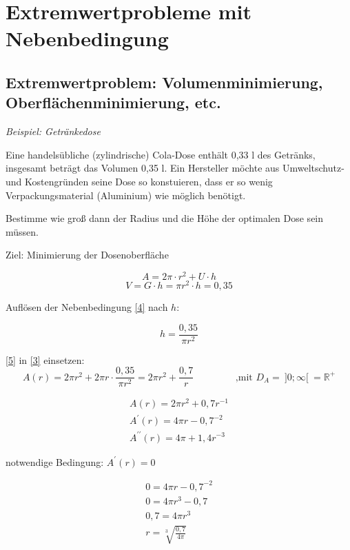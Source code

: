 \section{Extremwertprobleme mit Nebenbedingung}
\subsection{Extremwertproblem: Volumenminimierung, Oberflächenminimierung, etc.}

\textit{Beispiel: Getränkedose}

Eine handelsübliche (zylindrische) Cola-Dose enthält 0,33 l des Getränks, insgesamt beträgt das Volumen 0,35 l. Ein Hersteller möchte aus Umweltschutz- und Kostengründen seine Dose so konstuieren, dass er so wenig Verpackungsmaterial (Aluminium) wie möglich benötigt.

Bestimme wie groß dann der Radius und die Höhe der \glqq optimalen\grqq{} Dose sein müssen.

Ziel: Minimierung der Dosenoberfläche 

\begin{equation*}
    A = 2\pi \cdot r^2 + U \cdot h \tag{1}\label{3}
\end{equation*}
\begin{equation*}
    V = G \cdot h = \pi r^2 \cdot h = 0,35 \tag{2}\label{4}
\end{equation*}

Auflösen der Nebenbedingung \eqref{4} nach $h$:

\begin{equation*}
    h = \frac{0,35}{\pi r^2} \label{5}\tag{3}
\end{equation*}

\eqref{5} in \eqref{3} einsetzen: $$A(r) = 2\pi r^2 + 2\pi r\cdot\frac{0,35}{\pi r^2} = 2\pi r^2 + \frac{0,7}{r} \qquad \qquad \text{ ,mit } D_A = \ ]0;\infty[ \ = \mathbb{R}^+ $$

\begin{equation*}
    \begin{gathered}
        A(r) = 2\pi r^2 + 0,7r^{-1} \\
        A^\prime(r) = 4\pi r - 0,7^{-2} \\
        A^{\prime\prime}(r) = 4\pi + 1,4r^{-3}
    \end{gathered}
\end{equation*}

notwendige Bedingung: $A^\prime(r) = 0$

\begin{equation*}
    \begin{gathered}
        0 = 4\pi r - 0,7^{-2} \\
        0 = 4\pi r^3 - 0,7 \\
        0,7 = 4\pi r^3 \\
        r = \sqrt[3]{\frac{0,7}{4\pi}}
    \end{gathered}
\end{equation*}

